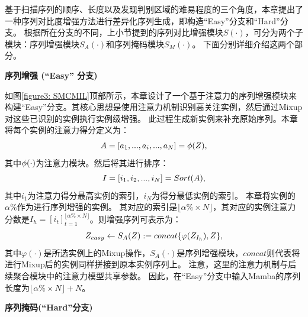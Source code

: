 基于扫描序列的顺序、长度以及发现判别区域的难易程度的三个角度，本章提出了一种序列对比度增强方法进行差异化序列生成，即构造“Easy”分支和“Hard”分支。
根据所在分支的不同，上小节提到的序列对比增强模块$S(\cdot)$，可分为两个子模块：序列增强模块$S_A(\cdot)$和序列掩码模块$S_M(\cdot)$。
下面分别详细介绍这两个部分。

\textbf{序列增强 (“Easy” 分支)} 

如图\ref{figure3: SMCMIL}顶部所示，本章设计了一个基于注意力的序列增强模块来构建“Easy”分支。其核心思想是使用注意力机制识别高关注实例，然后通过Mixup对这些已识别的实例执行实例级增强。
此过程生成新实例来补充原始序列。本章将每个实例的注意力得分定义为：
\begin{equation}
  \mathnormal{A}=[a_1,...,a_i,...,a_N]=\mathnormal{\phi}(\mathnormal{Z}),
  \label{eq8}
  \end{equation}
其中$\mathnormal{\phi}(\cdot)$为注意力模块。然后将其进行排序：
\begin{equation}
  \mathnormal{I}=[i_1,i_2,...,i_N]=Sort(\mathnormal{A}),
  \label{eq9}
  \end{equation}
其中$i_1$为注意力得分最高实例的索引，$i_N$为得分最低实例的索引。
本章将实例的$\alpha\%$作为进行序列增强的实例。
其对应的索引是$\lfloor \alpha\% \times N \rfloor$，其对应的实例注意力分数是$I_h=[i_t]^{\lfloor \alpha\% \times N \rfloor}_{t=1}$。则增强序列可表示为：
\begin{equation}
  \mathnormal{Z_{easy}}\leftarrow S_A(Z):=concat\{\varphi(Z_{\mathnormal{I}_h}),Z\},
  \label{eq10}
  \end{equation}
其中$\varphi(\cdot)$是所选实例上的Mixup操作，$S_A(\cdot)$是序列增强模块，$concat$则代表将进行Mixup后的实例同样拼接到原本实例序列上。
注意，这里的注意力机制与后续聚合模块中的注意力模型共享参数。
因此，在“Easy”分支中输入Mamba的序列长度为$\lfloor \alpha\% \times N \rfloor + N$。

\textbf{序列掩码(“Hard”分支)} 

